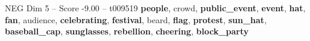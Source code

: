 \begin{textsample}{NEG Dim 5 – Score -9.00 – t009519}  \label{ex:f5_neg_006}
\textbf{people}, crowd, \textbf{public\_event}, \textbf{event}, \textbf{hat}, \textbf{fan}, audience, \textbf{celebrating}, \textbf{festival}, beard, \textbf{flag}, \textbf{protest}, \textbf{sun\_hat}, \textbf{baseball\_cap}, \textbf{sunglasses}, \textbf{rebellion}, \textbf{cheering}, \textbf{block\_party}

\end{textsample}
